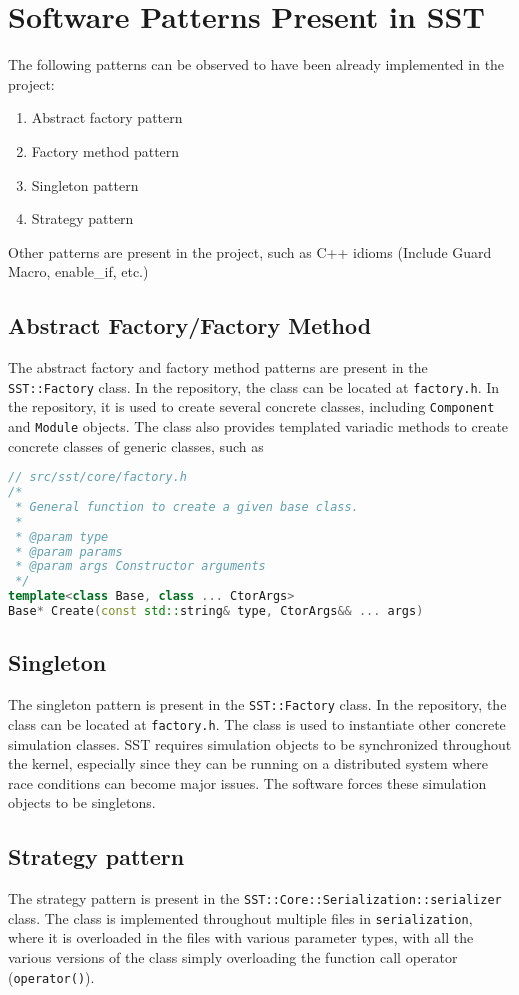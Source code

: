 \documentclass[titlepage]{article}
\begin{document}
\section{Software Patterns Present in SST}
The following patterns can be observed to have been already implemented in the project:
\begin{enumerate}
    \item Abstract factory pattern
    \item Factory method pattern
    \item Singleton pattern
    \item Strategy pattern
\end{enumerate}
Other patterns are present in the project, such as C++ idioms (Include Guard Macro, enable\_if, etc.)

\subsection{Abstract Factory/Factory Method}
The abstract factory and factory method patterns are present in the \texttt{SST::Factory} class. In the repository, the class can be located at \texttt{factory.h}. In the repository, it is used to create several concrete classes, including \texttt{Component} and \texttt{Module} objects. The class also provides templated variadic methods to create concrete classes of generic classes, such as
\begin{lstlisting}[language=c++]
// src/sst/core/factory.h
/*
 * General function to create a given base class.
 *
 * @param type
 * @param params
 * @param args Constructor arguments
 */
template<class Base, class ... CtorArgs>
Base* Create(const std::string& type, CtorArgs&& ... args)
\end{lstlisting}

\subsection{Singleton}
The singleton pattern is present in the \texttt{SST::Factory} class. In the repository, the class can be located at \texttt{factory.h}. The class is used to instantiate other concrete simulation classes. SST requires simulation objects to be synchronized throughout the kernel, especially since they can be running on a distributed system where race conditions can become major issues. The software forces these simulation objects to be singletons.

\subsection{Strategy pattern}
The strategy pattern is present in the \texttt{SST::Core::Serialization::serializer} class. The class is implemented throughout multiple files in \texttt{serialization}, where it is overloaded in the files with various parameter types, with all the various versions of the class simply overloading the function call operator (\texttt{operator()}).
\end{document}
